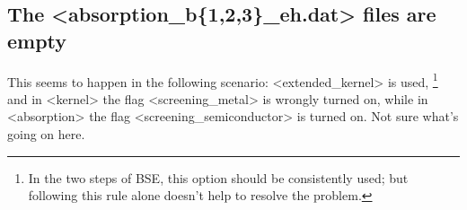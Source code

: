 \documentclass[hyperref, a4paper, 12pt]{report}
\def\texttt#1{<#1>}%
\newcommand{\shortcode}[1]{\texttt{#1}}
\begin{document}
\subsection{The \shortcode{absorption_b\{1,2,3\}_eh.dat} files are empty}

This seems to happen in the following scenario: 
\shortcode{extended_kernel} is used,%
\footnote{
    In the two steps of BSE, this option should be consistently used; 
    but following this rule alone doesn't help to resolve the problem.
}
and in \shortcode{kernel} the flag \shortcode{screening_metal} is wrongly turned on, 
while in \shortcode{absorption} the flag \shortcode{screening_semiconductor} is turned on.
Not sure what's going on here.



\end{document}
